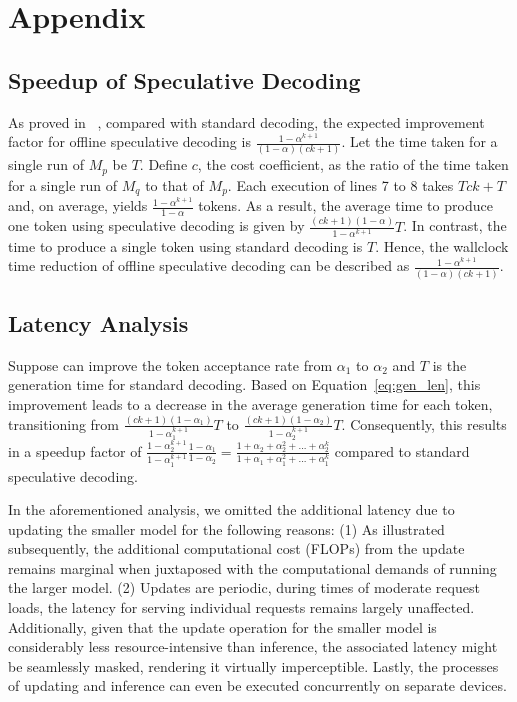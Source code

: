 \appendix
\section{Appendix}
\subsection{Speedup of Speculative Decoding}
As proved in ~\cite{leviathan2023fast}, compared with standard decoding, the expected improvement factor for offline speculative decoding is \(\frac{1-\alpha^{k+1}}{(1-\alpha)(ck+1)}\).
Let the time taken for a single run of \(M_p\) be \(T\). Define \(c\), the cost coefficient, as the ratio of the time taken for a single run of \(M_q\) to that of \(M_p\).
Each execution of lines 7 to 8 takes \(Tck + T\) and, on average, yields \(\frac{1-\alpha^{k+1}}{1-\alpha}\) tokens.
As a result, the average time to produce one token using speculative decoding is given by \(\frac{(ck+1)(1-\alpha)}{1-\alpha^{k+1}}T\). 
In contrast, the time to produce a single token using standard decoding is \(T\). 
Hence, the wallclock time reduction of offline speculative decoding can be described as \(\frac{1-\alpha^{k+1}}{(1-\alpha)(ck+1)}\).

\subsection{Latency Analysis}
\label{appendix:latency-analysis}
Suppose \tool can improve the token acceptance rate from \( \alpha_1 \) to \( \alpha_2 \) %
and $T$ is the generation time for standard decoding. Based on Equation~\ref{eq:gen_len}, this improvement leads to a decrease in the average generation time for each token, transitioning from \( \frac{(ck+1)(1-\alpha_1)}{1-\alpha_{1}^{k+1}}T \) to \( \frac{(ck+1)(1-\alpha_2)}{1-\alpha_{2}^{k+1}}T \). Consequently, this results in a speedup factor of \( \frac{1-\alpha_2^{k+1}}{1-\alpha_1^{k+1}}\frac{1-\alpha_1}{1-\alpha_2} = \frac{1+\alpha_2+\alpha_2^2+...+\alpha_2^{k}}{1+\alpha_1+\alpha_1^2+...+\alpha_1^k}\) compared to standard speculative decoding.

In the aforementioned analysis, we omitted the additional latency due to updating the smaller model for the following reasons:
(1) As illustrated subsequently, the additional computational cost (FLOPs) from the update remains marginal when juxtaposed with the 
computational demands of running the larger model.
(2) Updates are periodic, during times of moderate request loads, the latency for serving individual requests remains largely unaffected. 
Additionally, given that the update operation for the smaller model is considerably less resource-intensive than inference, 
the associated latency might be seamlessly masked, rendering it virtually imperceptible.
Lastly, the processes of updating and inference can even be executed concurrently on separate devices.

